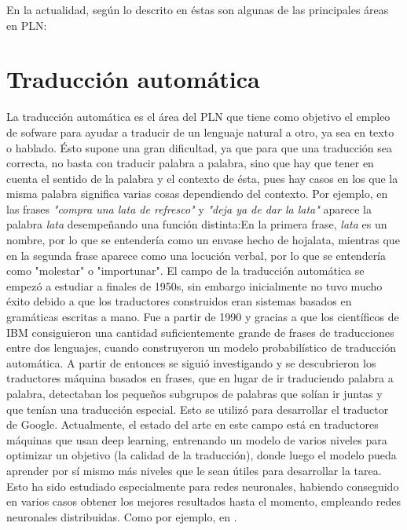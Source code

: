 En la actualidad, según lo descrito en \citet{hirschberg2015advances} éstas son algunas de las principales áreas en PLN:
\section*{Traducción automática}
La traducción automática es el área del PLN que tiene como objetivo el empleo de sofware para ayudar a traducir de un lenguaje natural a otro, ya sea en texto o hablado. Ésto supone una gran dificultad, ya que para que una traducción sea correcta, no basta con traducir palabra a palabra, sino que hay que tener en cuenta el sentido de la palabra y el contexto de ésta, pues hay casos en los que la misma palabra significa varias cosas dependiendo del contexto. Por ejemplo, en las frases \textsl{"compra una lata de refresco"} y \textsl{"deja ya de dar la lata"} aparece la  palabra \textsl{lata} desempeñando una  función distinta:\newline En la primera frase, \textsl{lata} es un nombre, por lo que se entendería como un envase hecho de hojalata, mientras que en la segunda frase aparece como una locución verbal, por lo que se entendería como "molestar" o "importunar". \newline  
El campo de la traducción automática se empezó a estudiar a finales de 1950s, sin embargo inicialmente no tuvo mucho éxito debido a que los traductores construidos eran sistemas basados en gramáticas escritas a mano. Fue a partir de 1990 y gracias a que los científicos de IBM consiguieron una cantidad suficientemente grande de frases de traducciones entre dos lenguajes, cuando construyeron un modelo probabilístico de traducción automática.\newline
A partir de entonces se siguió investigando y se descubrieron los \textcolor{SchoolColor}{traductores máquina basados en frases}, que en lugar de ir traduciendo palabra a palabra, detectaban los pequeños subgrupos de palabras que solían ir juntas y que tenían una traducción especial. Esto se utilizó para desarrollar el traductor de Google.  
\newline
Actualmente, el estado del arte en este campo está en traductores máquinas que usan deep learning, entrenando un modelo de varios niveles para optimizar un objetivo (la calidad de la traducción), donde luego el modelo pueda aprender por sí mismo más niveles que le sean útiles para desarrollar la tarea. Esto ha sido estudiado especialmente para redes neuronales, habiendo conseguido en varios casos obtener los mejores resultados hasta el momento, empleando redes neuronales distribuidas. Como por ejemplo, en  \citet{luong2014addressing}.

